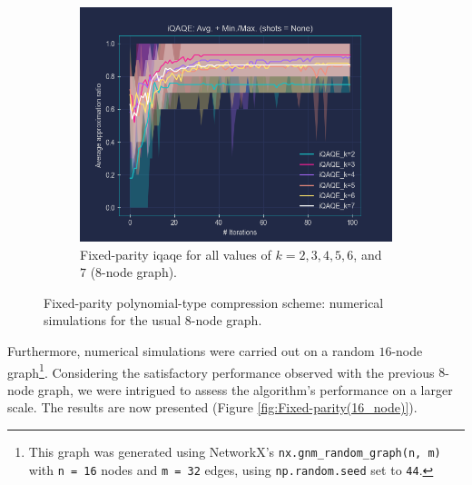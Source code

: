 \clearpage

\begin{figure}[ht!]
  \addtocounter{figure}{-1} %
  \centering
  \begin{subfigure}[b]{1\textwidth}
      \addtocounter{subfigure}{2} %
      \centering
      \includegraphics[width=1\textwidth]{Figures/Chapter_5/Fixed-parity/All_k's(8-node).png}
      \caption{Fixed-parity \acrshort{iqaqe} for all values of $k = 2, 3, 4, 5, 6$, and $7$ ($8$-node graph).}
      \label{fig:Fixed-parity/All_k's}
  \end{subfigure}
  \caption{Fixed-parity polynomial-type compression scheme: numerical simulations for the usual $8$-node graph.}
  \label{fig:Fixed-parity}
\end{figure}

Furthermore, numerical simulations were carried out on a random $16$-node graph\footnote{This graph was generated using NetworkX's \texttt{nx.gnm\_random\_graph(n, m)} with \texttt{n = 16} nodes and \texttt{m = 32} edges, using \texttt{np.random.seed} set to \texttt{44}.}. Considering the satisfactory performance observed with the previous $8$-node graph, we were intrigued to assess the algorithm's performance on a larger scale. The results are now presented (Figure \ref{fig:Fixed-parity(16_node)}).

